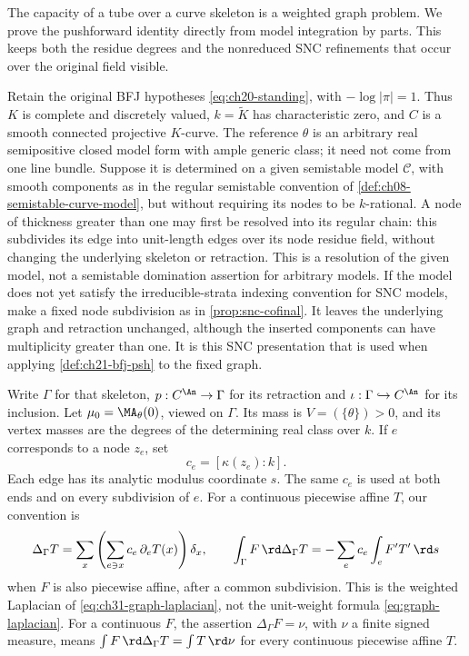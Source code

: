 The capacity of a tube over a curve skeleton is a weighted graph
problem.  We prove the pushforward identity directly from model
integration by parts.  This keeps both the residue degrees and the
nonreduced SNC refinements that occur over the original field visible.

Retain the original BFJ hypotheses \eqref{eq:ch20-standing}, with
\(-\log|\pi|=1\).  Thus \(K\) is complete and discretely valued,
\(k=\widetilde K\) has characteristic zero, and \(C\) is a smooth
connected projective \(K\)-curve.  The reference \(\theta\) is an
arbitrary real semipositive closed model form with ample generic class;
it need not come from one line bundle.  Suppose it is determined on
a given semistable model \(\mathcal C\), with smooth components as in
the regular semistable convention of
\cref{def:ch08-semistable-curve-model}, but without requiring its nodes
to be \(k\)-rational.  A node of thickness greater than one may first
be resolved into its regular chain: this subdivides its edge into
unit-length edges over its node residue field, without changing the
underlying skeleton or retraction.  This is a resolution of the given
model, not a semistable domination assertion for arbitrary models.
If the model does not yet satisfy the irreducible-strata indexing
convention for SNC models, make a fixed node subdivision as in
\cref{prop:snc-cofinal}.  It leaves the underlying graph and
retraction unchanged, although the inserted components can have
multiplicity greater than one.  It is this SNC presentation that
is used when applying \cref{def:ch21-bfj-psh} to the fixed graph.

Write \(\Gamma\) for that skeleton,
\(p:C^{\An}\to\Gamma\) for its retraction and
\(\iota:\Gamma\hookrightarrow C^{\An}\) for its inclusion.  Let
\(\mu_0=\MA_\theta(0)\), viewed on \(\Gamma\).  Its mass is
\(V=(\{\theta\})>0\), and its vertex masses are the degrees of the
determining real class over \(k\).  If \(e\) corresponds to a node
\(z_e\), set
\[
 c_e=[\kappa(z_e):k].
\]
Each edge has its analytic modulus coordinate \(s\).  The same
\(c_e\) is used at both ends and on every subdivision of \(e\).
For a continuous piecewise affine \(T\), our convention is
\[
 \Delta_\Gamma T
 =\sum_x\left(\sum_{e\ni x}c_e\,\partial_eT(x)\right)\delta_x,
 \qquad
 \int_\Gamma F\,\rd\Delta_\Gamma T
 =-\sum_e c_e\int_e F'T'\,\rd s
\]
when \(F\) is also piecewise affine, after a common subdivision.
This is the weighted Laplacian of
\eqref{eq:ch31-graph-laplacian}, not the unit-weight formula
\eqref{eq:graph-laplacian}.  For a continuous \(F\), the assertion
\(\Delta_\Gamma F=\nu\), with \(\nu\) a finite signed measure, means
\(\int F\,\rd\Delta_\Gamma T=\int T\,\rd\nu\) for every continuous
piecewise affine \(T\).

